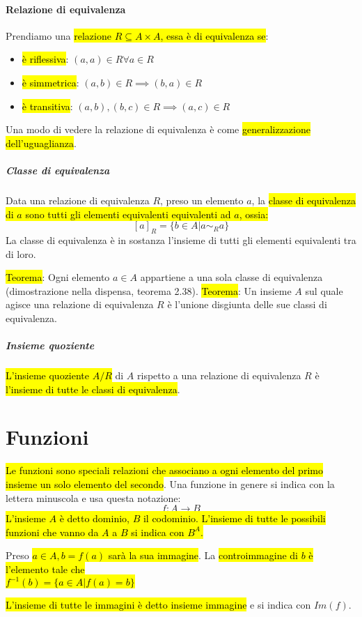 \paragraph{Relazione di equivalenza} Prendiamo una \hl{relazione
$R \subseteq A \times A$, essa è di equivalenza se}:
\begin{itemize}
    \item \hl{è riflessiva}: $(a,a) \in R \forall a \in R$
    \item \hl{è simmetrica}: $(a,b) \in R \implies (b,a) \in R$
    \item \hl{è transitiva}: $(a,b), (b,c) \in R \implies (a,c) \in R$
\end{itemize}
Una modo di vedere la relazione di equivalenza è come \hl{generalizzazione
dell'uguaglianza}.

\subparagraph{Classe di equivalenza} Data una relazione di equivalenza $R$, preso
un elemento $a$, la \hl{classe di equivalenza di $a$ sono tutti gli elementi
equivalenti equivalenti ad $a$, ossia:}
    \[ {[a]}_R = \{ b \in A | a \sim_R a \} \]
La classe di equivalenza è in sostanza l'insieme di tutti gli elementi
equivalenti tra di loro.

\hl{Teorema}: Ogni elemento $a \in A$ appartiene a una sola classe di equivalenza
(dimostrazione nella dispensa, teorema 2.38).
\hl{Teorema}: Un insieme $A$ sul quale agisce una relazione di equivalenza $R$
è l'unione disgiunta delle sue classi di equivalenza.

\subparagraph{Insieme quoziente} \hl{L'insieme quoziente $A/R$} di $A$ rispetto
a una relazione di equivalenza $R$ è \hl{l'insieme di tutte le classi di
equivalenza}.

\section{Funzioni}
\hl{Le funzioni sono speciali relazioni che associano a ogni elemento del
primo insieme un solo elemento del secondo}. Una funzione in genere si indica
con la lettera minuscola e usa questa notazione: \[ f: A \to B \]
\hl{L'insieme $A$ è detto dominio, $B$ il codominio. L'insieme di tutte le
possibili funzioni che vanno da $A$ a $B$ si indica con $B^A$.}

Preso \hl{$a \in A, b = f(a)$ sarà la sua immagine}. La \hl{controimmagine
di $b$ è l'elemento tale che \\ $f^{-1}(b) = \{ a \in A | f(a) = b \}$}

\hl{L'insieme di tutte le immagini è detto insieme immagine} e si indica con
$Im(f)$.

